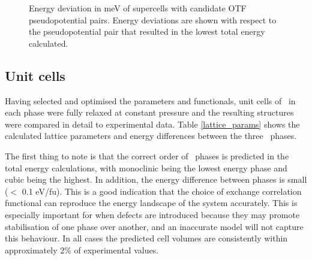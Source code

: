 \begin{figure}[ht]
  \begin{center}
    \caption{Energy deviation in meV of supercells with candidate OTF pseudopotential pairs. Energy deviations are shown with respect to the pseudopotential pair that resulted in the lowest total energy calculated.}
    \label{Figure:otf_pp_test}
  \end{center}
\end{figure}

\subsection{Unit cells}

Having selected and optimised the parameters and functionals, unit cells of \zirconia\ in each phase were fully relaxed at constant pressure and the resulting structures were compared in detail to experimental data. Table \ref{lattice_params} shows the calculated lattice parameters and energy differences between the three \zirconia\ phases. 

The first thing to note is that the correct order of \zirconia\ phases is predicted in the total energy calculations, with monoclinic being the lowest energy phase and cubic being the highest. In addition, the energy difference between phases is small ($<$ 0.1 eV/fu). This is a good indication that the choice of exchange correlation functional can reproduce the energy landscape of the system accurately. This is especially important for when defects are introduced because they may promote stabilisation of one phase over another, and an inaccurate model will not capture this behaviour. In all cases the predicted cell volumes are consistently within approximately 2\% of experimental values. 

